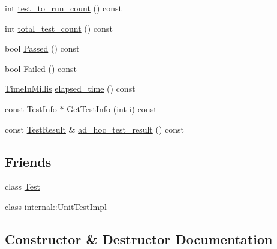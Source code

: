 \begin{DoxyCompactItemize}
\item 
int \hyperlink{classtesting_1_1TestCase_a47de0cf87858370388275c9d995f1ff4}{test\+\_\+to\+\_\+run\+\_\+count} () const 
\item 
int \hyperlink{classtesting_1_1TestCase_ac7b2ed22822735b7b9ae2740162332c9}{total\+\_\+test\+\_\+count} () const 
\item 
bool \hyperlink{classtesting_1_1TestCase_ad093a04334d7eb8d707a7f1a321b040f}{Passed} () const 
\item 
bool \hyperlink{classtesting_1_1TestCase_a5c0922d310f860e78cca7e215f2fa0e4}{Failed} () const 
\item 
\hyperlink{namespacetesting_a992de1d091ce660f451d1e8b3ce30fd6}{Time\+In\+Millis} \hyperlink{classtesting_1_1TestCase_a80f163d2826ba8586fffb41e8d686727}{elapsed\+\_\+time} () const 
\item 
const \hyperlink{classtesting_1_1TestInfo}{Test\+Info} $\ast$ \hyperlink{classtesting_1_1TestCase_a9a7d5757d4b352cda2dddd0fda714a88}{Get\+Test\+Info} (int \hyperlink{gtest__output__test__golden__lin_8txt_a7e98b8a17c0aad30ba64d47b74e2a6c1}{i}) const 
\item 
const \hyperlink{classtesting_1_1TestResult}{Test\+Result} \& \hyperlink{classtesting_1_1TestCase_a3993481a8f0c2253653b5e1ec5934432}{ad\+\_\+hoc\+\_\+test\+\_\+result} () const 
\end{DoxyCompactItemize}
\subsection*{Friends}
\begin{DoxyCompactItemize}
\item 
class \hyperlink{classtesting_1_1TestCase_a5b78b1c2e1fa07ffed92da365593eaa4}{Test}
\item 
class \hyperlink{classtesting_1_1TestCase_acc0a5e7573fd6ae7ad1878613bb86853}{internal\+::\+Unit\+Test\+Impl}
\end{DoxyCompactItemize}


\subsection{Constructor \& Destructor Documentation}
